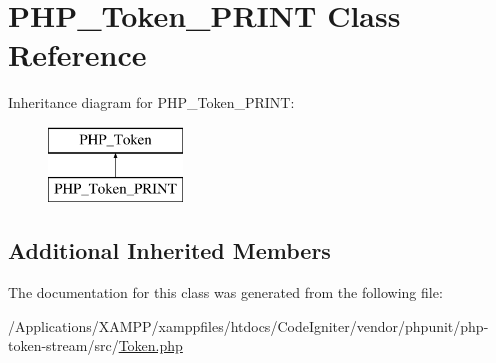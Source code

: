 \hypertarget{class_p_h_p___token___p_r_i_n_t}{}\section{P\+H\+P\+\_\+\+Token\+\_\+\+P\+R\+I\+NT Class Reference}
\label{class_p_h_p___token___p_r_i_n_t}
Inheritance diagram for P\+H\+P\+\_\+\+Token\+\_\+\+P\+R\+I\+NT\+:\begin{figure}[H]
\begin{center}
\leavevmode
\includegraphics[height=2.000000cm]{class_p_h_p___token___p_r_i_n_t}
\end{center}
\end{figure}
\subsection*{Additional Inherited Members}


The documentation for this class was generated from the following file\+:\begin{DoxyCompactItemize}
\item 
/\+Applications/\+X\+A\+M\+P\+P/xamppfiles/htdocs/\+Code\+Igniter/vendor/phpunit/php-\/token-\/stream/src/\mbox{\hyperlink{_token_8php}{Token.\+php}}\end{DoxyCompactItemize}
